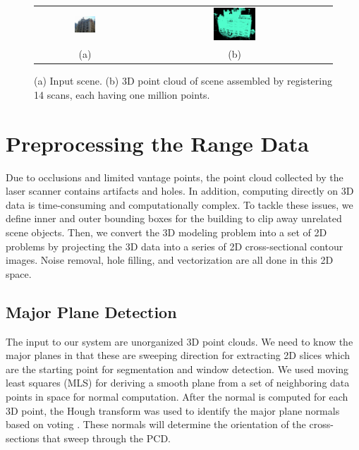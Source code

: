 \documentclass[10pt,journal,cspaper,compsoc]{IEEEtran}
\begin{document}
\begin{figure}[htbp]
\begin{center}
\begin{tabular}{cc}
	\includegraphics[width=0.22\textwidth]{HunterPhoto.jpg} &
	\includegraphics[width=0.22\textwidth]{point_cloud.png} \\
	(a) & (b) \\
\end{tabular}
\end{center}
\caption{
(a) Input scene.
(b) 3D point cloud of scene assembled by registering 14 scans, each having
one million points.
}
\label{fig:IR_2_DXF}
\end{figure}

\section{Preprocessing the Range Data}
\label{sec:prep}

Due to occlusions and limited vantage points, the point cloud collected by the
laser scanner contains artifacts and holes.
In addition, computing directly on 3D data is time-consuming and
computationally complex.
To tackle these issues, we define inner and outer bounding boxes for the
building to clip away unrelated scene objects.
Then, we convert the 3D modeling problem into a set of 2D problems by
projecting the 3D data into a series of 2D cross-sectional contour images.
Noise removal, hole filling, and vectorization are all done in this
2D space.


\subsection{Major Plane Detection}
\label{sec:major_plane}

The input to our system are unorganized 3D point clouds.
We need to know the major planes in that
these are sweeping direction for extracting 2D slices which
are the starting point for segmentation and window detection.
We used moving least squares (MLS) for deriving a smooth plane from a set
of neighboring data points in space for normal computation.
After the normal is computed for each 3D point, the Hough transform was used
to identify the major plane normals based on voting \cite{MLS01}.
These normals will determine the orientation of the cross-sections that
sweep through the PCD.
\end{document}
